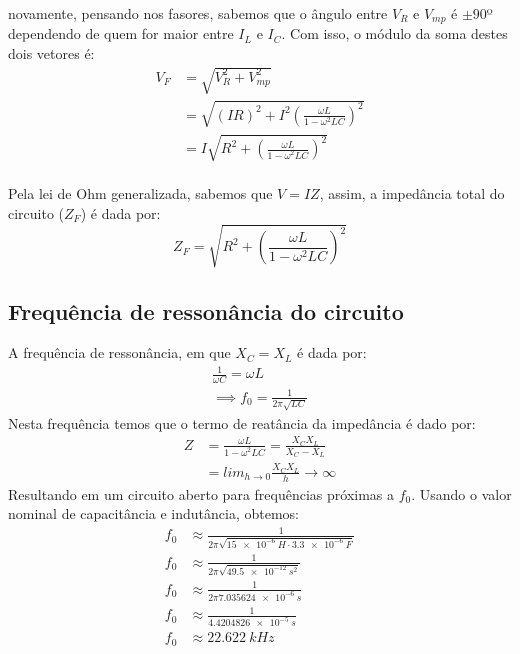novamente, pensando nos fasores, sabemos que o ângulo entre \(V_{R}\) e \(V_{mp}\) é \(\pm 90\)º dependendo de quem for maior entre \(I_{L}\) e \(I_{C}\). Com isso, o módulo da soma destes dois vetores é:
\begin{align*}
    V_{F} &= \sqrt{V_{R}^{2} + V_{mp}^{2}}\\
          &= \sqrt{(IR)^{2} + I^{2}\left(\frac{\omega L}{1 - \omega^{2} L C }  \right)^{2}} \\
          &= I\sqrt{R^{2} + \left(\frac{\omega L}{1 - \omega^{2} L C }  \right)^{2}} \\
\end{align*}

Pela lei de Ohm generalizada, sabemos que \(V = IZ\), assim, a impedância total do circuito (\(Z_{F}\)) é dada por:
\[
          Z_{F} = \sqrt{R^{2} + \left(\frac{\omega L}{1 - \omega^{2} L C }  \right)^{2}}
\]

\subsection{Frequência de ressonância do circuito}

A frequência de ressonância, em que \(X_C = X_L\) é dada por:
\begin{align*}
    \frac{1}{\omega C} = \omega L \\
    \implies f_0 = \frac{1}{2 \pi \sqrt{L C}} 
\end{align*}
Nesta frequência temos que o termo de reatância da impedância é dado por:
\begin{align*}
    Z &=  \frac{\omega L}{1 - \omega^{2} L C} = \frac{X_C X_L}{X_C - X_L} \\
      &= lim_{h \to 0}\frac{X_C X_L}{h} \to \infty 
\end{align*}
Resultando em um circuito aberto para frequências próximas a \(f_0\). Usando o valor nominal de capacitância e indutância, obtemos:
\begin{align*}
    f_0 &\approx \frac{1}{2 \pi \sqrt{\qty{15e-6}{H} \cdot \qty{3.3e-6}{F}  }} \\
    f_0 &\approx \frac{1}{2 \pi \sqrt{\qty{49.5e-12}{s^2}}} \\
    f_0 &\approx \frac{1}{2 \pi \qty{7.035624e-6}{s}} \\
    f_0 &\approx \frac{1}{\qty{4.4204826e-5}{s}} \\
    f_0 &\approx \qty{22.622}{kHz}\\
\end{align*}


